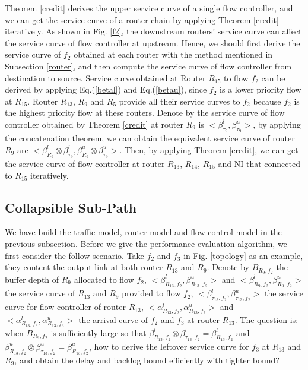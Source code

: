 \documentclass[10pt,journal]{IEEEtran}
\begin{document}
Theorem \ref{credit} derives the upper service curve of a single flow controller, and we can get the service curve of a router chain by applying Theorem
\ref{credit} iteratively. As shown in Fig. \ref{f2}, the downstream routers' service curve can affect the service curve of flow controller at upstream. Hence, we should first derive the service curve of $f_2$ obtained at each router with the method mentioned in Subsection \ref{router}, and then compute the service curve of flow controller from destination to source. Service curve obtained at Router $R_{15}$ to flow $f_2$ can be derived by applying Eq.(\ref{betal}) and Eq.(\ref{betau}), since $f_2$ is a lower priority flow at $R_{15}$. Router $R_{13}$, $R_{9}$ and $R_{5}$ provide all their service curves to $f_2$ because $f_2$ is the highest priority flow at these routers. Denote by the service curve of flow controller obtained by Theorem \ref{credit} at router $R_{9}$ is $<\beta_{\tau_9}^l,\beta_{\tau_9}^u>$, by applying the concatenation theorem, we can obtain the equivalent service curve of router $R_{9}$ are $<\beta_{R_9}^l\otimes\beta_{\tau_9}^l,\beta_{R_9}^u\otimes\beta_{\tau_9}^u>$. Then, by applying Theorem \ref{credit}, we can get the service curve of flow controller at router $R_{13}$, $R_{14}$, $R_{15}$ and NI that connected to $R_{15}$ iteratively.

\subsection{Collapsible Sub-Path}
We have build the traffic model, router model and flow control model in the previous subsection. Before we give the performance evaluation algorithm, we first consider the follow scenario. Take $f_2$ and $f_3$ in Fig. \ref{topology} as an example, they content the output link at both router $R_{13}$ and $R_{9}$. Denote by $B_{R_9,f_2}$ the buffer depth of $R_{9}$ allocated to flow $f_2$, $<\beta_{R_{13},f_2}^l,\beta_{R_{13},f_2}^u>$ and $<\beta_{R_{9},f_2}^l,\beta_{R_{9},f_2}^u>$ the service curve of $R_{13}$ and $R_{9}$ provided to flow $f_2$, $<\beta_{\tau_{13},f_2}^l,\beta_{\tau_{13},f_2}^u>$ the service curve for flow controller of router $R_{13}$, $<\alpha_{R_{13},f_2}^l,\alpha_{R_{13},f_2}^u>$ and $<\alpha_{R_{13},f_3}^l,\alpha_{R_{13},f_3}^u>$ the arrival curve of $f_2$ and $f_3$ at router $R_{13}$. The question is: when $B_{R_9,f_2}$ is sufficiently large so that $\beta_{R_{13},f_2}^l\otimes\beta_{\tau_{13},f_2}^l=\beta_{R_{13},f_2}^l$ and $\beta_{R_{13},f_2}^u\otimes\beta_{\tau_{13},f_2}^u=\beta_{R_{13},f_2}^u$, how to derive the leftover service curve for $f_3$ at $R_{13}$ and $R_9$, and obtain the delay and backlog bound efficiently with tighter bound?
\end{document}
